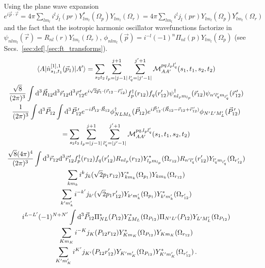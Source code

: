 \documentclass[10pt]{article}
\begin{document}
Using the plane wave expansion $e^{i \vec{p} \cdot \vec{r}} = 4 \pi \sum_{l m_l} i^{l} j_{l}(p r) Y_{l m_l}^{*}(\Omega_{p}) Y_{l m_l}(\Omega_{r}) = 4 \pi \sum_{l m_l} i^{l} j_{l}(p r) Y_{l m_l}(\Omega_{p}) Y_{l m_l}^{*}(\Omega_{r})$ and the fact that the isotropic harmonic oscillator wavefunctions factorize in $\psi_{n l m_l}(\vec{r}) = R_{n l}(r) Y_{l m_l}(\Omega_{r})$, $\phi_{n l m_l}(\vec{p}) = i^{-l}(-1)^{n} \Pi_{n l}(p) Y_{l m_l}(\Omega_{p})$ (see Secs.~\ref{sec:def},\ref{sec:ft_transforms}).
\begin{multline*}
	\braket{ A | \hat{n}_{s_1,t_1}^{[1],1}(\vec{p}_1) | A'} = \sum_{s_2 t_2}  \sum_{l_p = |j-1|}^{j+1} \sum_{l_q' = |j' - 1|}^{j'+1} \mathcal{M}_{AA'}^{p q,l_p l_q'}(s_1,t_1,s_2,t_2) \\
  \frac{\sqrt{8}}{(2 \pi)^{3}} \int \text{d}^{3} \vec{R}_{12} \text{d}^{3} \vec{r}_{12} \text{d}^{3} \vec{r}_{12}^{\, \prime}  e^{ i \sqrt{2} \vec{p}_{1} \cdot ( \vec{r}_{12} - \vec{r}_{12}^{\, \prime}) }  f_{p}^{\dagger}(r_{12}) f_{q}(r_{12}') \psi_{ n l_p m_{l_p}}^{\dagger}(\vec{r}_{12}) \psi_{ n' l_q' m_{l_q'}}(\vec{r}_{12}^{\, \prime})  \\
   \frac{1}{(2 \pi)^{3}} \int \text{d}^{3} \vec{P}_{12} \int \text{d}^{3} \vec{P}_{12}^{\, \prime} e^{ -i \vec{P}_{12} \cdot \vec{R}_{12}} \phi_{N L M_L}^{\dagger}(\vec{P}_{12}) e^{ i \vec{P}_{12}^{\, \prime} \cdot ( \vec{R}_{12} - \vec{r}_{12} + \vec{r}_{12}^{\, \prime})} \phi_{N' L' M_L'}(\vec{P}_{12}^{\, \prime}) \\
   = \sum_{s_2 t_2}  \sum_{l_p = |j-1|}^{j+1} \sum_{l_q' = |j' - 1|}^{j'+1} \mathcal{M}_{AA'}^{p q,l_p l_q'}(s_1,t_1,s_2,t_2) \\
    \frac{\sqrt{8} (4 \pi)^{4}}{(2 \pi)^{3}} \int \text{d}^{3} \vec{r}_{12} \text{d}^{3} \vec{r}_{12}^{\, \prime} f_{p}^{\dagger}(r_{12}) f_{q}(r_{12}')  R_{n l_p}(r_{12}) Y_{l_p m_{l_p}}^{*}(\Omega_{r_{12}}) R_{n' l_q'}(r_{12}') Y_{l_q' m_{l_q'}}(\Omega_{r_{12}'}) \\
   \sum_{k m_k} i^{k} j_{k}( \sqrt{2} p_1 r_{12}) Y_{k m_k}^{*}(\Omega_{p_1}) Y_{k m_k}(\Omega_{r_{12}}) \\
   \sum_{k' m_k'} i^{-k'} j_{k'}( \sqrt{2} p_1 r_{12}') Y_{k' m_k'}(\Omega_{p_1}) Y_{k' m_k'}^{*}(\Omega_{r_{12}'}) \\
   i^{L-L'} (-1)^{N+N'}
   \int \text{d}^{3} \vec{P}_{12} \Pi_{N L}^{*}(P_{12}) Y_{L M_L}^{*}(\Omega_{P_{12}}) \Pi_{N' L'}(P_{12}) Y_{L' M_L'}(\Omega_{P_{12}})   \\
   \sum_{K m_K} i^{-K} j_{K}(P_{12} r_{12}) Y_{K m_K}^{*}(\Omega_{P_{12}}) Y_{K m_K}(\Omega_{r_{12}}) \\
   \sum_{K' m_K'} i^{K'} j_{K'}(P_{12} r_{12}') Y_{K' m_K'}(\Omega_{P_{12}}) Y_{K' m_K'}^{*}(\Omega_{r_{12}'}) \, . \\
\end{multline*}
\end{document}
